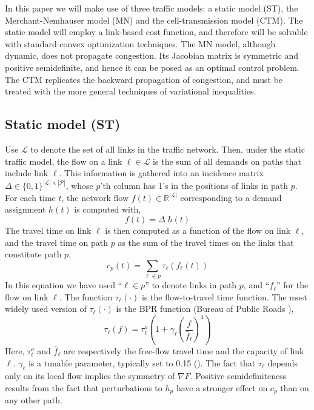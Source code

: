 In this paper we will make use of three traffic models: a static model (ST), the Merchant-Nemhauser model (MN) and the cell-transmission model (CTM). The static model will employ a link-based cost function, and therefore will be solvable with standard convex optimization techniques. The MN model, although dynamic, does not propagate congestion. Its Jacobian matrix is symmetric and positive semidefinite, and hence it can be posed as an optimal control problem. The CTM replicates the backward propagation of congestion, and must be treated with the more general techniques of variational inequalities. 

\subsection{Static model (ST)}
Use $\mathcal{L}$ to denote the set of all links in the traffic network. Then, under the static traffic model, the flow on a link $\ell\in\mathcal{L}$ is the sum of all demands on paths that include link $\ell$. This information is gathered into an incidence matrix 
$\Delta\in\{0,1\}^{|\mathcal{L}|\times|\mathcal{P}|}$, whose $p$'th column has 1's in the positions of links in path $p$. For each time $t$, the network flow $f(t)\in\mathbb{R}^{|\mathcal{L}|}$ corresponding to a demand assignment $h(t)$ is computed with,
\begin{equation}
\label{eq:staticmodel}
f(t) = \Delta \; h(t) 
\end{equation}
The travel time on link $\ell$ is then computed as a function of the flow on link $\ell$, and the travel time on path $p$ as the sum of the travel times on the links that constitute path $p$,
\begin{equation}
\label{eq:statictt}
c_p(t) = \sum_{\ell\in p} \tau_\ell(f_\ell(t))
\end{equation}
In this equation we have used ``$\ell\in p$'' to denote links in path $p$, and ``$f_\ell$'' for the flow on link $\ell$. The function $\tau_\ell(\cdot)$ is the flow-to-travel time function. The most widely used version of $\tau_\ell(\cdot)$ is the BPR function (Bureau of Public Roads \cite{wiki_Route_Choice}),
\begin{equation}
\label{eq:bpr}
\tau_\ell(f) = \tau^o_\ell\left( 1 + \gamma_\ell  \left( \frac{f}{\bar{f}_\ell} \right)^4 \right)
\end{equation}
Here, $\tau^o_\ell$ and $\bar{f}_\ell$ are respectively the free-flow travel time and the capacity of link $\ell$. $\gamma_\ell$ is a tunable parameter, typically set to 0.15 (\cite{wiki_Route_Choice}). The fact that $\tau_\ell$ depends only on its local flow implies the symmetry of $\nabla F$. Positive semidefiniteness results from the fact that perturbations to $h_p$ have a stronger effect on $c_p$ than on any other path. 

